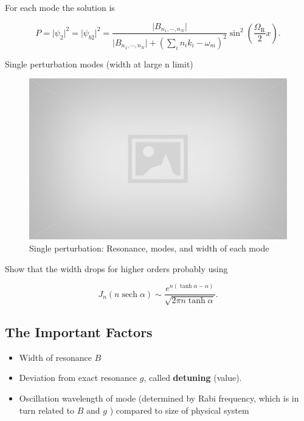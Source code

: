 \documentclass[%
preprint,
 amsmath,amssymb,
 aps,
]{revtex4-1}
\newcommand{\sech}[1]{{\operatorname{sech}{#1}}}
\begin{document}
For each mode the solution is

\begin{equation}
P = \lvert \psi_2 \rvert^2 = \lvert \psi_{b2} \rvert^2 = \frac{\lvert B_{n_1,\cdots,n_N} \rvert}{\lvert B_{n_1,\cdots,n_N} \rvert + (\sum_i n_i k_i - \omega_m )^2} \sin^2 \left( \frac{\Omega_{\mathrm R}}{2} x \right) .
\end{equation}



Single perturbation modes (width at large n limit)

\begin{figure}[!htbp]
    \centering
    \includegraphics[width=\textwidth]{assets/placeholder.jpg}
    \caption{Single perturbation: Resonance, modes, and width of each mode}
    \label{fig:single-perturbation-modes}
\end{figure}


Show that the width drops for higher orders probably using

\begin{equation}
J_n(n \sech \alpha) \sim \frac{ e^{n(\tanh\alpha - \alpha)} }{\sqrt{ 2\pi n \tanh \alpha } }.
\end{equation}





    

\subsection{The Important Factors}



\begin{itemize}
            \item Width of resonance $B$
            \item Deviation from exact resonance $g$, called {\bf{detuning}} (value).
            \item Oscillation wavelength of mode (determined by Rabi frequency, which is in turn related to $B$ and $g$ ) compared to size of physical system
\end{itemize}
\end{document}
